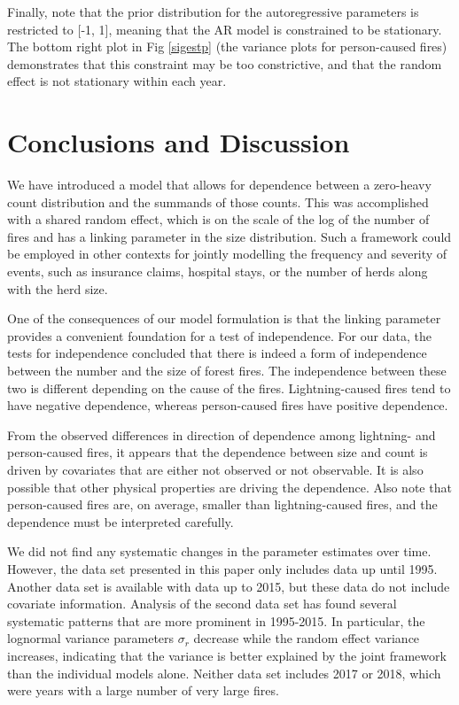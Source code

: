 \documentclass[10pt,letterpaper]{article}
\begin{document}
Finally, note that the prior distribution for the autoregressive
parameters is restricted to {[}-1, 1{]}, meaning that the AR model is
constrained to be stationary. The bottom right plot in Fig
\ref{sigestp} (the variance plots for person-caused fires) demonstrates
that this constraint may be too constrictive, and that the random effect
is not stationary within each year.

\hypertarget{conclusions-and-discussion}{%
\section{Conclusions and Discussion}\label{conclusions-and-discussion}}

We have introduced a model that allows for dependence between a zero-heavy count distribution and the summands of those counts. This was accomplished
with a shared random effect, which is on the scale of the log of the
number of fires and has a linking parameter in the size
distribution. Such a framework could be employed in other contexts for
jointly modelling the frequency and severity of events, such as
insurance claims, hospital stays, or the number of herds along with the herd size.

One of the consequences of our model formulation is that the linking parameter provides a convenient foundation for a test of
independence. For our data, the tests for independence concluded that
there is indeed a form of independence between the number and the size
of forest fires. The independence between these two is different depending
on the cause of the fires. Lightning-caused fires tend to have negative
dependence, whereas person-caused fires have positive dependence.

From the observed differences in direction of dependence among lightning- and person-caused fires, it appears that the dependence
between size and count is driven by covariates that are either not
observed or not observable. It is also possible that other physical
properties are driving the dependence. Also note that person-caused
fires are, on average, smaller than lightning-caused fires, and the
dependence must be interpreted carefully.

We did not find any systematic changes in the parameter estimates over
time. However, the data set presented in this paper only includes data
up until 1995. Another data set is available with data up to 2015, but
these data do not include covariate information. Analysis of the second
data set has found several systematic patterns that are more prominent
in 1995-2015. In particular, the lognormal variance parameters
\(\sigma_r\) decrease while the random effect variance increases,
indicating that the variance is better explained by the joint framework
than the individual models alone. Neither data set includes 2017 or
2018, which were years with a large number of very large fires.
\end{document}
